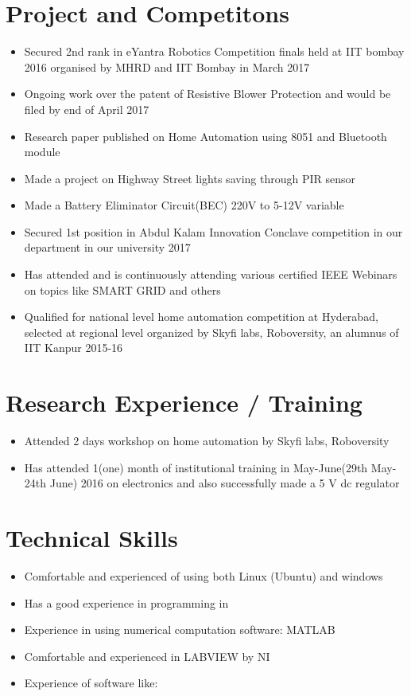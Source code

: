 \documentclass[]{article}
\begin{document}
\section{Project and Competitons }
\begin{itemize}
\item Secured 2nd rank in eYantra Robotics Competition finals held at IIT bombay 2016 organised by MHRD and IIT Bombay in March 2017
\item Ongoing work over the patent of Resistive Blower Protection and would be filed by end of April 2017
\item Research paper published on Home Automation using 8051 and Bluetooth module
\item Made a project on Highway Street lights saving through PIR sensor 
\item Made a Battery Eliminator Circuit(BEC) 220V to 5-12V variable
\item Secured 1st position in Abdul Kalam Innovation Conclave competition in our department in our university 2017
\item Has attended and is continuously attending various certified IEEE Webinars on topics like SMART GRID and others
\item Qualified for national level home automation competition at Hyderabad, selected at regional level organized by Skyfi labs, Roboversity, an alumnus of IIT Kanpur 2015-16 
\end{itemize}

\pagebreak

\section{Research Experience / Training }
\begin{itemize}
\item Attended 2 days workshop on home automation by Skyfi labs, Roboversity
\item Has attended 1(one) month of institutional training in May-June(29th May-24th June) 2016 on electronics and also successfully made a 5 V dc regulator
\end{itemize}

\section{ Technical Skills}
\begin{itemize}
\item Comfortable and experienced of using both Linux (Ubuntu) and windows
\item Has a good experience in programming in
	
\item Experience in using numerical computation software: MATLAB 
\item Comfortable and experienced in LABVIEW by NI
\item Experience of software like:
 	
\end{itemize}
\end{document}
